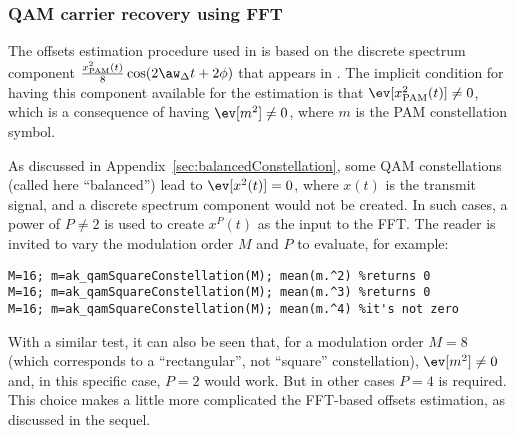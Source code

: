 \subsubsection{QAM carrier recovery using FFT}

The offsets estimation procedure used in  is based on the discrete spectrum component $\frac{x^2_\textrm{PAM}(t)}{8} \cos(2\aw_{\Delta} t + 2\phi)$
that appears in . The implicit condition for having this component available for the
estimation is that $\ev[x^2_\textrm{PAM}(t)] \ne 0$, which is a consequence of having 
$\ev[m^2] \ne 0$, where $m$ is the PAM constellation symbol.

As discussed in Appendix~\ref{sec:balancedConstellation}, some QAM constellations (called here ``balanced'') lead to $\ev[x^2(t)]=0$, where $x(t)$ is the transmit signal, and a discrete spectrum component would not be created.
In such cases, a power of $P \ne 2$ is used to
create $x^P(t)$ as the input to the FFT. The reader is invited to vary the
modulation order $M$ and $P$ to evaluate, for example:
\begin{lstlisting}
M=16; m=ak_qamSquareConstellation(M); mean(m.^2) %returns 0
M=16; m=ak_qamSquareConstellation(M); mean(m.^3) %returns 0
M=16; m=ak_qamSquareConstellation(M); mean(m.^4) %it's not zero
\end{lstlisting}
With a similar test, it can also be seen that, for a modulation order $M=8$ (which corresponds to a ``rectangular'', not
``square'' constellation), $\ev[m^2] \ne 0$ and, in this specific case, $P=2$ would work.
But in other cases $P=4$ is required. This choice makes a little more complicated
the FFT-based offsets estimation, as discussed in the sequel.

